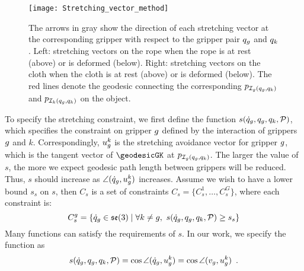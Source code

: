 \begin{figure}[h]
    \centering
    \texttt{[image: Stretching\_vector\_method]}
    \caption{The arrows in gray show the direction of each stretching vector at the corresponding gripper with respect to the gripper pair $q_g$ and $q_k$. Left: stretching vectors on the rope when the rope is at rest (above) or is deformed (below). Right: stretching vectors on the cloth when the cloth is at rest (above) or is deformed (below). The red lines denote the geodesic connecting the corresponding $p_{\mathcal{I}_g(q_g, q_k)}$ and $p_{\mathcal{I}_k(q_g, q_k)}$ on the object.}
    \label{Fig:stretching_avoidance_vector_method}
\end{figure}

To specify the stretching constraint, we first define the function $s(\dot{q}_g, q_g, q_k, \mathcal{P})$, which specifies the constraint on gripper $g$ defined by the interaction of grippers $g$ and $k$. Correspondingly, $u_g^k$ is the stretching avoidance vector for gripper $g$, which is the tangent vector of $\geodesicGK$ at $p_{\mathcal{I}_g(q_g, q_k)}$. The larger the value of $s$, the more we expect geodesic path length between grippers will be reduced. Thus, $s$ should increase as $\angle (\dot{q}_g, u_g^k)$ increases. Assume we wish to have a lower bound $s_s$ on $s$, then $C_s$ is a set of constraints $C_s = \{C_s^1, \dots, C_s^G\}$, where each constraint is:
\begin{equation}
    C_s^g =\{ \dot{q}_g\in \mathfrak{se}(3) \mid \forall k\neq g, \ s(\dot{q}_g, q_g, q_k, \mathcal{P}) \geq s_s  \}
    \label{Eq:Stretching_avoidance_Method}
\end{equation}
Many functions can satisfy the requirements of $s$. In our work, we specify the function as
\begin{equation}
    s(\dot{q}_g, q_g, q_k, \mathcal{P}) = \cos \angle (\dot{q}_g, u_g^k ) = \cos \angle (v_g, u_g^k ) \enspace .
    \label{Eq:Stretching_avoidance_Method_This_Paper}
\end{equation}

